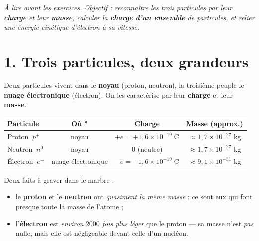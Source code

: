 \documentclass[11pt,a4paper]{article}
\newcommand{\pp}{p^{+}}
\newcommand{\ee}{e^{-}}
\newcommand{\nz}{n^{0}}
\begin{document}

\vspace{3pt}
{\small\itshape À lire avant les exercices. Objectif : reconnaître les trois particules par leur
\textbf{charge} et leur \textbf{masse}, calculer la \textbf{charge d'un ensemble} de particules, et
relier une énergie cinétique d'électron à sa vitesse.}

\section*{1. Trois particules, deux grandeurs}

Deux particules vivent dans le \textbf{noyau} (proton, neutron), la troisième peuple le \textbf{nuage
électronique} (électron). On les caractérise par leur \textbf{charge} et leur \textbf{masse}.

\begin{center}
\renewcommand{\arraystretch}{1.3}
\begin{tabular}{l c c c}
\toprule
\rowcolor{primary!14}
\textbf{Particule} & \textbf{Où ?} & \textbf{Charge} & \textbf{Masse (approx.)} \\
\midrule
Proton $\ \pp$    & noyau              & $+e = +1{,}6\times10^{-19}$ C & $\approx 1{,}7\times10^{-27}$ kg \\
Neutron $\ \nz$   & noyau              & $0$ (neutre)                  & $\approx 1{,}7\times10^{-27}$ kg \\
Électron $\ \ee$  & nuage électronique & $-e = -1{,}6\times10^{-19}$ C & $\approx 9{,}1\times10^{-31}$ kg \\
\bottomrule
\end{tabular}
\end{center}

\noindent Deux faits à graver dans le marbre :
\begin{itemize}
  \item le \textbf{proton} et le \textbf{neutron} ont \emph{quasiment la même masse} : ce sont eux qui
        font presque toute la masse de l'atome ;
  \item l'\textbf{électron} est \emph{environ $2000$ fois plus léger} que le proton — sa masse n'est
        \emph{pas} nulle, mais elle est négligeable devant celle d'un nucléon.
\end{itemize}
\end{document}
